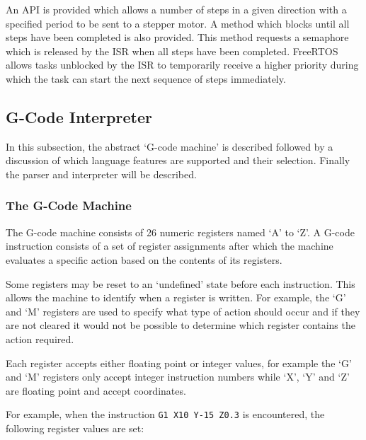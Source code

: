 				An API is provided which allows a number of steps in a given direction
				with a specified period to be sent to a stepper motor. A method which
				blocks until all steps have been completed is also provided. This method
				requests a semaphore which is released by the ISR when all steps have
				been completed. FreeRTOS allows tasks unblocked by the ISR to
				temporarily receive a higher priority during which the task can start
				the next sequence of steps immediately.
		
		\subsection{G-Code Interpreter}
			
			In this subsection, the abstract `G-code machine' is described followed by
			a discussion of which language features are supported and their selection.
			Finally the parser and interpreter will be described.
			
			\subsubsection{The G-Code Machine}
				
				The G-code machine consists of 26 numeric registers named `A' to `Z'.
				A G-code instruction consists of a set of register assignments after
				which the machine evaluates a specific action based on the contents of
				its registers.
				
				Some registers may be reset to an `undefined' state before each
				instruction. This allows the machine to identify when a register is
				written. For example, the `G' and `M' registers are used to specify what
				type of action should occur and if they are not cleared it would not be
				possible to determine which register contains the action required.
				
				Each register accepts either floating point or integer values, for
				example the `G' and `M' registers only accept integer instruction
				numbers while `X', `Y' and `Z' are floating point and accept
				coordinates.
				
				For example, when the instruction \verb|G1 X10 Y-15 Z0.3| is
				encountered, the following register values are set:
				
				\begin{gcoderegs}
				\end{gcoderegs}
				
